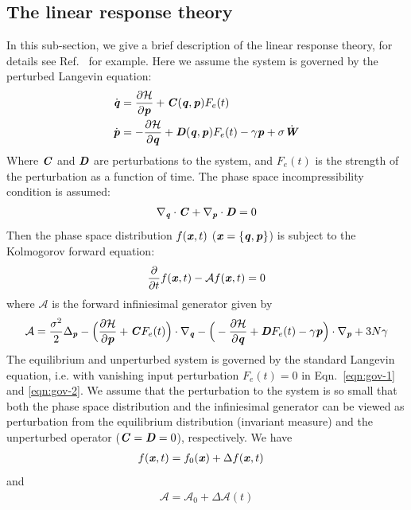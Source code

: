 \documentclass[aip,jcp,a4paper,reprint,onecolumn]{revtex4-1}
\newcommand{\vect}[1]{\textbf{\textit{#1}}}
\newcommand{\mh}{\mathcal H}
\newcommand{\fwg}{{\mathcal A}}
\begin{document}
\subsection{The linear response theory}
In this sub-section, we give a brief description of the linear response
theory, for details see Ref.~\cite{tuckeman2010statistical} for
example. Here we assume the system is governed by the
perturbed Langevin equation:
\begin{align}\label{eqn:gov-1}
  \dot{\vect q} & = \frac{\partial\mh}{\partial \vect p}
  + \vect C(\vect q,\vect p) F_e(t)\\\label{eqn:gov-2}
  \dot{\vect p} & =- \frac{\partial\mh}{\partial \vect q}
  + \vect D(\vect q,\vect p) F_e(t)
  - \gamma\vect p
  + \sigma\dot{\vect W}
\end{align}
Where $\vect C$ and $\vect D$ are perturbations to the system, and
$F_e(t)$ is the strength of the perturbation as a function of time.
The phase space incompressibility condition is assumed:
\begin{align}
  \nabla_{\vect q}\cdot\vect C + \nabla_{\vect p}\cdot\vect D = 0
\end{align}
Then the phase space distribution $f(\vect x, t)$ ($\vect x = \{\vect
q, \vect p\}$) is subject to the Kolmogorov forward equation:
\begin{align}
  \frac{\partial}{\partial t} f(\vect x, t) - \fwg f(\vect x, t) = 0
\end{align}
where $\fwg$ is the forward infiniesimal generator given by
\begin{align}
  \fwg =
  \frac{\sigma^2}2\Delta_{\vect p}
  - \Big(
  \frac{\partial \mh}{\partial\vect p} + \vect C F_e(t)
  \Big)\cdot\nabla_{\vect q}
  - \Big(
  -\frac{\partial \mh}{\partial\vect q} +
  \vect D F_e(t) - \gamma\vect p
  \Big)\cdot\nabla_{\vect p}
  + 3N\gamma
\end{align}
The equilibrium and unperturbed system
is governed by
the standard Langevin equation, i.e. with
vanishing input perturbation $F_e(t) = 0$ in
Eqn.~\eqref{eqn:gov-1} and \eqref{eqn:gov-2}.
We assume that the perturbation to the
system is so small that both the phase space distribution and the
infiniesimal generator can be viewed as perturbation from the equilibrium
distribution (invariant measure) and the unperturbed operator
($\vect C = \vect D = 0$),
respectively. We have
\begin{align}
  f(\vect x, t) &= f_0(\vect x) + \Delta  f(\vect x, t)
\end{align}
and 
\begin{align}
  \fwg = \fwg_0 + \Delta\fwg(t)
\end{align}
\end{document}
